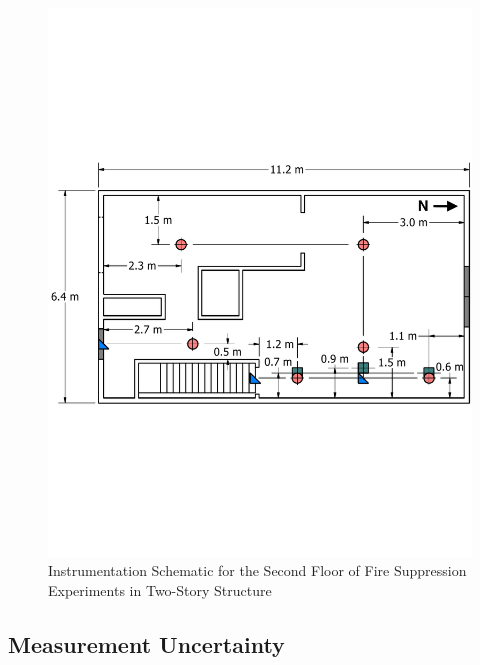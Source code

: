 \documentclass[12pt,oneside]{book}
\begin{document}
\begin{figure}[!ht]
	\includegraphics[width=\columnwidth]{../../DelCo_2014_2015/Drawings/PDFs/CAFS/West_Structure_2nd_Floor_Instrumentation}
	\caption{Instrumentation Schematic for the Second Floor of Fire Suppression Experiments in Two-Story Structure}
	\label{fig:fire_supp_second_2story}
\end{figure}

\clearpage

\subsection{Measurement Uncertainty}
\label{subsec:Uncertainty}
\end{document}
